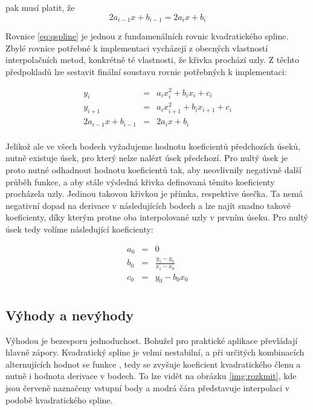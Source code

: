 \documentclass[]{thesiskiv}
\begin{document}
pak musí platit, že
\begin{equation}\label{eq:qspline}
2a_{i-1}x+b_{i-1}=2a_{i}x+b_{i}
\end{equation}

Rovnice \ref{eq:qspline} je jednou z fundamenálních rovnic kvadratického spline. Zbylé rovnice potřebné k implementaci vycházejí z obecných vlastností interpolačních metod, konkrétně té vlastnosti, že křivka prochází uzly. Z těchto předpokladů lze sestavit finální soustavu rovnic potřebných k implementaci:

\begin{equation}
\begin{array}{rcl}
 y_{i} & = & a_{i}x_{i}^2 + b_{i}x_{i} + c_{i} \\
 y_{i+1} & = & a_{i}x_{i+1}^2 + b_{i}x_{i+1} + c_{i} \\
 2a_{i-1}x+b_{i-1} & = & 2a_{i}x+b_{i} \\
\end{array}
\end{equation}

Jelikož ale ve všech bodech vyžadujeme hodnotu koeficientů předchozích úseků, nutně existuje úsek, pro který nelze nalézt úsek předchozí. Pro nultý úsek je proto nutné odhadnout hodnotu koeficientů tak, aby neovlivnily negativně další průběh funkce, a aby stále výsledná křivka definovaná těmito koeficienty procházela uzly. Jedinou takovou křivkou je přímka, respektive úsečka. Ta nemá negativní dopad na derivace v následujících bodech a lze najít snadno takové koeficienty, díky kterým protne oba interpolované uzly v prvním úseku. Pro nultý úsek tedy volíme následující koeficienty:

\begin{equation}
\begin{array}{rcl}
 a_{0} & = & 0 \\
 b_{0} & = & \frac{y_1 - y_0}{x_1 - x_0} \\
 c_{0} & = & y_0 - b_0 x_0 \\
\end{array}
\end{equation}

\subsection*{Výhody a nevýhody}

Výhodou je bezesporu jednoduchost. Bohužel pro praktické aplikace převládají hlavně zápory. Kvadratický spline je velmi nestabilní, a při určitých kombinacích alternujících hodnot se funkce , tedy se zvyšuje koeficient kvadratického členu a nutně i hodnota derivace v bodech. To lze vidět na obrázku \ref{img:rozkmit}, kde jsou červeně naznačeny vstupní body a modrá čára představuje interpolaci v podobě kvadratického spline.
\end{document}
